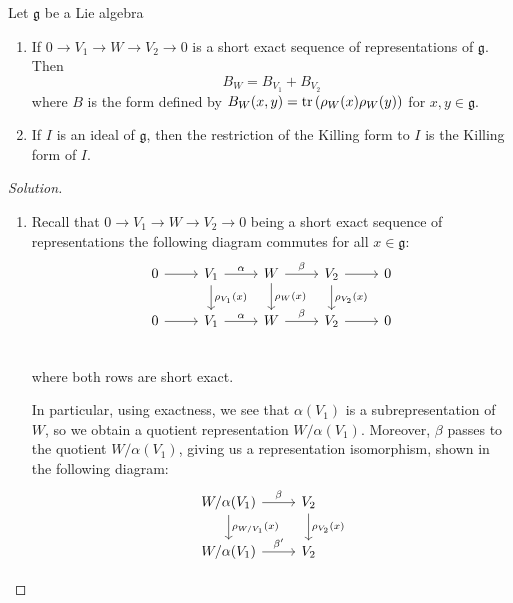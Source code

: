\documentclass{report}
\begin{document}
\begin{exercise}[Exercise 5.1]
    Let $\mathfrak g $ be a Lie algebra
    \begin{enumerate}[label = (\roman*)]
        \item If $0 \to V_1 \to W \to V_2 \to 0$ is a short exact sequence of representations of $\mathfrak g$.
        Then
        \[
        B_W = B_{V_1} + B_{V_2}
        \]
        where $B$ is the form defined by $B_W(x,y) = \operatorname{tr}\left(\rho_W(x)\rho_W(y)\right)$ for $x,y \in \mathfrak g$.
        \item If $I$ is an ideal of $\mathfrak g$, then the restriction of the Killing form to $I$ is the Killing form of $I$.
    \end{enumerate} 
\end{exercise}
\begin{proof}[Solution]
    \begin{enumerate}[label = (\roman*)]
        \item 
        Recall that $0 \to V_1 \to W \to V_2 \to 0$ being a short exact sequence of representations the following diagram commutes for all $x \in \mathfrak g$:
    \[
    \begin{tikzcd}
        0 \arrow[r] & V_1 \arrow[r, "\alpha"] \arrow[d, "\rho_{V_1}(x)"] & W \arrow[r, "\beta"] \arrow[d, "\rho_W(x)"] & V_2 \arrow[r] \arrow[d, "\rho_{V_2}(x)"] & 0\\
        0 \arrow[r] & V_1 \arrow[r, "\alpha"] & W \arrow[r, "\beta"]  & V_2 \arrow[r] & 0\\
    \end{tikzcd}
    \]
    where both rows are short exact.
    
    In particular, using exactness, we see that $\alpha(V_1)$ is a subrepresentation of $W$, so we obtain a quotient representation $W/\alpha(V_1)$.
    Moreover, $\beta$ passes to the quotient $W/\alpha(V_1)$, giving us a representation isomorphism, shown in the following diagram:
    \[
    \begin{tikzcd}
        W/\alpha(V_1) \arrow[r, "\beta"] \arrow[d, "\rho_{W/V_1}(x)"] & V_2 \arrow[d, "\rho_{V_2}(x)"]\\
        W/\alpha(V_1) \arrow[r, "\beta'"] & V_2
    \end{tikzcd}
    \]
    

\end{enumerate}
\end{proof}
\end{document}
